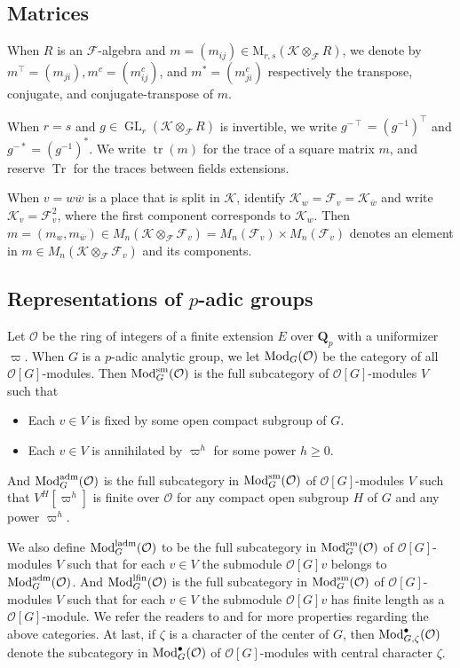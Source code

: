 \documentclass[leqno]{amsart}
\theoremstyle{definition}
\theoremstyle{remark}
\newcommand{\oo}{\mathcal{O}}
\newcommand{\Qp}{\mathbf{Q}_p}
\DeclareMathOperator{\Tr}{Tr}
\DeclareMathOperator{\GL}{GL}
\DeclareMathOperator{\mtr}{tr}
\DeclareMathOperator{\Mod}{\textnormal{Mod}}
\newcommand{\sm}{\textnormal{sm}}
\newcommand{\adm}{\textnormal{adm}}
\newcommand{\ladm}{\textnormal{ladm}}
\newcommand{\lfin}{\textnormal{lfin}}
\newcommand{\F}{{\mathcal{F}}} %
\newcommand{\K}{{\mathcal{K}}} %
\newcommand{\bw}{{\overline{w}}}
\begin{document}
\subsection{Matrices}
When $R$ is an $\F$-algebra and 
$m=(m_{ij})\in \text{M}_{r,s}(\K\otimes_\F R)$,
we denote by 
$m^\intercal=(m_{ji}), 
m^c=(m^c_{ij})$, and
$m^*=(m^c_{ji})$
respectively the transpose, conjugate, and conjugate-transpose of $m$.

When $r=s$ and $g\in \GL_r(\K\otimes_\F R)$ is invertible, we write
$g^{-\intercal}=(g^{-1})^\intercal$ and $g^{-*}=(g^{-1})^*$.
We write $\mtr(m)$ for the trace of a square matrix $m$,
and reserve $\Tr$ for the traces between fields extensions.

When $v=w\bw$ is a place that is split in $\K$,
identify $\K_w=\F_v=\K_{\bw}$ and 
write $\K_v=\F_v^2$, 
where the first component corresponds to $\K_w$.
Then $m=(m_w,m_{\bw})\in M_n(\K\otimes_\F\F_v)=M_n(\F_v)\times M_n(\F_v)$ 
denotes an element in $m\in M_n(\K\otimes_\F\F_v)$ and its components.

\subsection{Representations of $p$-adic groups}

Let $\oo$ be the ring of integers of a finite extension $E$
over  $\Qp$ with a uniformizer $\varpi$.
When $G$ is a $p$-adic analytic group,
we let $\Mod_G(\oo)$ be the category
of all $\oo[G]$-modules.
Then $\Mod^{\sm}_{G}(\oo)$ is the full subcategory 
of $\oo[G]$-modules $V$ such that 
\begin{itemize}
    \item Each $v\in V$ is fixed by some open compact subgroup of $G$.
    \item Each $v\in V$ is annihilated by $\varpi^h$ for some power 
    $h\geq 0$.
\end{itemize}
And $\Mod^{\adm}_{G}(\oo)$ is the full subcategory 
in $\Mod^{\sm}_{G}(\oo)$ of $\oo[G]$-modules $V$ such that 
$V^H[\varpi^h]$ is finite over $\oo$
for any compact open subgroup $H$ of $G$ and any power $\varpi^h$.

We also define $\Mod^{\ladm}_{G}(\oo)$ to be the full subcategory 
in $\Mod^{\sm}_{G}(\oo)$ of $\oo[G]$-modules $V$ 
such that for each $v\in V$ 
the submodule $\oo[G]v$ belongs to $\Mod^{\adm}_G(\oo)$.
And $\Mod^{\lfin}_G(\oo)$ is the full subcategory 
in $\Mod^{\sm}_{G}(\oo)$ of $\oo[G]$-modules $V$ 
such that for each $v\in V$ 
the submodule $\oo[G]v$ has finite length as a $\oo[G]$-module.
We refer the readers to \cite[\S 2]{emeI} and \cite[\S 2]{pask}
for more properties regarding the above categories.
At last, if $\zeta$ is a character of the center of $G$,
then $\Mod^{\bullet}_{G,\zeta}(\oo)$
denote the subcategory in $\Mod^{\bullet}_{G}(\oo)$ of 
$\oo[G]$-modules with central character $\zeta$.
\end{document}
